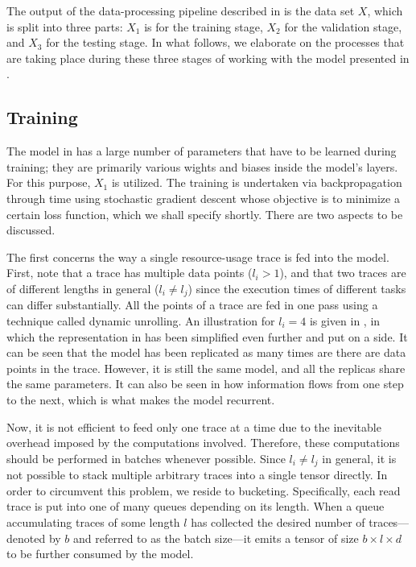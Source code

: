 The output of the data-processing pipeline described in  is the data
set $X$, which is split into three parts: $X_1$ is for the training stage, $X_2$
for the validation stage, and $X_3$ for the testing stage. In what follows, we
elaborate on the processes that are taking place during these three stages of
working with the model presented in .

\subsection{Training} 
The model in  has a large number of parameters that have to be
learned during training; they are primarily various wights and biases inside the
model's layers. For this purpose, $X_1$ is utilized. The training is undertaken
via backpropagation through time using stochastic gradient descent
\cite{goodfellow2016} whose objective is to minimize a certain loss function,
which we shall specify shortly. There are two aspects to be discussed.


The first concerns the way a single resource-usage trace is fed into the model.
First, note that a trace has multiple data points ($l_i > 1$), and that two
traces are of different lengths in general ($l_i \neq l_j$) since the execution
times of different tasks can differ substantially. All the points of a trace are
fed in one pass using a technique called dynamic unrolling. An illustration for
$l_i = 4$ is given in , in which the representation in 
has been simplified even further and put on a side. It can be seen that the
model has been replicated as many times are there are data points in the trace.
However, it is still the same model, and all the replicas share the same
parameters. It can also be seen in  how information flows from one
step to the next, which is what makes the model recurrent.

Now, it is not efficient to feed only one trace at a time due to the inevitable
overhead imposed by the computations involved. Therefore, these computations
should be performed in batches whenever possible. Since $l_i \neq l_j$ in
general, it is not possible to stack multiple arbitrary traces into a single
tensor directly. In order to circumvent this problem, we reside to bucketing.
Specifically, each read trace is put into one of many queues depending on its
length. When a queue accumulating traces of some length $l$ has collected the
desired number of traces---denoted by $b$ and referred to as the batch size---it
emits a tensor of size $b \times l \times d$ to be further consumed by the
model.

